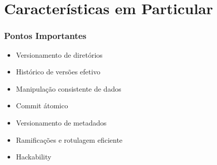 \documentclass{beamer}
\begin{document}
\section{Caracter\'isticas em Particular}
\begin{frame}
    \frametitle{Pontos Importantes}
    \begin{itemize}
        \item{Versionamento de diretórios}
        \item{Histórico de versões efetivo}
        \item{Manipulação consistente de dados}
        \item{Commit \'atomico}
        \item{Versionamento de metadados}
        \item{Ramificações e rotulagem eficiente}
        \item{Hackability}
    \end{itemize}
\end{frame}
\end{document}
